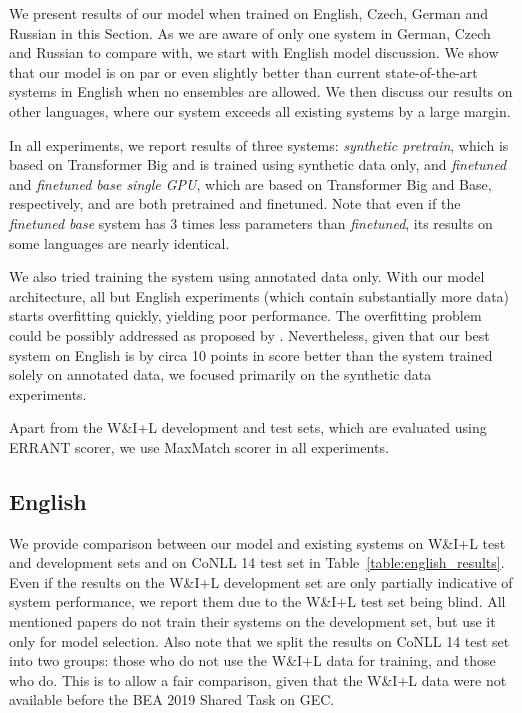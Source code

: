 \documentclass[11pt,a4paper]{article}
\begin{document}
We present results of our model when trained on English, Czech, German and Russian in this Section. As we are aware of only one system in German, Czech and Russian to compare with, we start with English model discussion. We show that our model is on par or even slightly better than current state-of-the-art systems in English when no ensembles are allowed. We then discuss our results on other languages, where our system exceeds all existing systems by a large margin.

In all experiments, we report results of three systems: \textit{synthetic pretrain}, which is based on Transformer Big and is trained using synthetic data only, and \textit{finetuned} and \textit{finetuned base single GPU}, which are based on Transformer Big and Base, respectively, and are both pretrained and finetuned. Note that even if the \textit{finetuned base} system has 3 times less parameters than \textit{finetuned}, its results on some languages are nearly identical.

We also tried training the system using annotated data only. With our model architecture, all but English experiments (which contain substantially more data) starts overfitting quickly, yielding poor performance. The overfitting problem could be possibly addressed as proposed by . Nevertheless, given that our best system on English is by circa 10 points in  score better than the system trained solely on annotated data, we focused primarily on the synthetic data experiments. 

Apart from the W\&I+L development and test sets, which are evaluated using ERRANT scorer, we use MaxMatch scorer in all experiments.

\subsection{English}

We provide comparison between our model and existing systems on W\&I+L test and development sets and on CoNLL 14 test set in Table~\ref{table:english_results}. Even if the results on the W\&I+L development set are only partially indicative of system performance, we report them due to the W\&I+L test set being blind. All mentioned papers do not train their systems on the development set, but use it only for model selection. Also note that we split the results on CoNLL 14 test set into two groups: those who do not use the W\&I+L data for training, and those who do. This is to allow a fair comparison, given that the W\&I+L data were not available before the BEA 2019 Shared Task on GEC.
\end{document}
